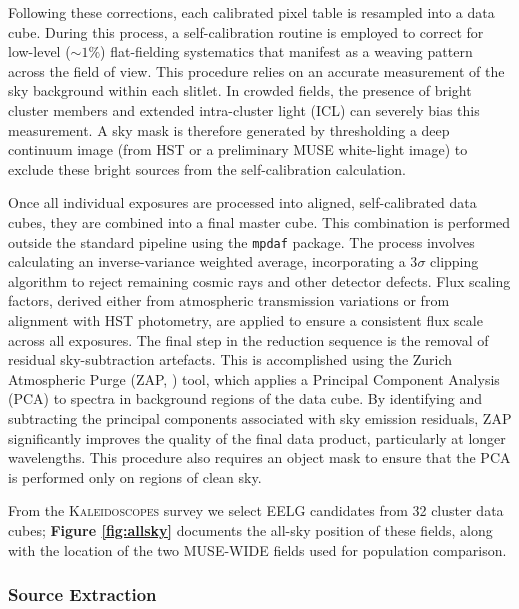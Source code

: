 \documentclass[fleqn,usenatbib]{mnras}
\begin{document}
Following these corrections, each calibrated pixel table is resampled into a data cube. During this process, a self-calibration routine is employed to correct for low-level ($\sim1\%$) flat-fielding systematics that manifest as a weaving pattern across the field of view. This procedure relies on an accurate measurement of the sky background within each slitlet. In crowded fields, the presence of bright cluster members and extended intra-cluster light (ICL) can severely bias this measurement. A sky mask is therefore generated by thresholding a deep continuum image (from HST or a preliminary MUSE white-light image) to exclude these bright sources from the self-calibration calculation.

Once all individual exposures are processed into aligned, self-calibrated data cubes, they are combined into a final master cube. This combination is performed outside the standard pipeline using the \texttt{mpdaf} package. The process involves calculating an inverse-variance weighted average, incorporating a 3$\sigma$ clipping algorithm to reject remaining cosmic rays and other detector defects. Flux scaling factors, derived either from atmospheric transmission variations or from alignment with HST photometry, are applied to ensure a consistent flux scale across all exposures. The final step in the reduction sequence is the removal of residual sky-subtraction artefacts. This is accomplished using the Zurich Atmospheric Purge (ZAP, \cite{soto2016}) tool, which applies a Principal Component Analysis (PCA) to spectra in background regions of the data cube. By identifying and subtracting the principal components associated with sky emission residuals, ZAP significantly improves the quality of the final data product, particularly at longer wavelengths. This procedure also requires an object mask to ensure that the PCA is performed only on regions of clean sky. 

From the \textsc{Kaleidoscopes} survey we select EELG candidates from 32 cluster data cubes; \textbf{Figure \ref{fig:allsky}} documents the all-sky position of these fields, along with the location of the two MUSE-WIDE fields used for population comparison.

\subsubsection{Source Extraction}
\end{document}
